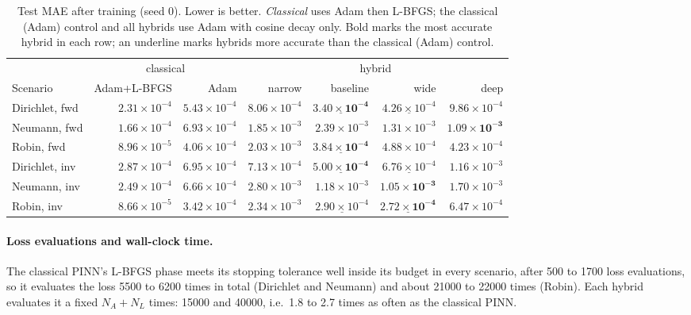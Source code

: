 \begin{table}[t]
\centering
\caption{Test MAE after training (seed 0). Lower is better. \emph{Classical} uses Adam then L-BFGS; the
classical (Adam) control and all hybrids use Adam with cosine decay only. Bold marks the most accurate hybrid in
each row; an underline marks hybrids more accurate than the classical (Adam) control.}
\label{tab:conv-mae}
\small
\setlength{\tabcolsep}{4pt}
\begin{tabular}{@{}lrrrrrr@{}}
\toprule
 & \multicolumn{2}{c}{classical} & \multicolumn{4}{c}{hybrid} \\
\cmidrule(lr){2-3}\cmidrule(l){4-7}
Scenario & Adam+L-BFGS & Adam & narrow & baseline & wide & deep \\
\midrule
Dirichlet, fwd & $2.31\times10^{-4}$ & $5.43\times10^{-4}$ & $8.06\times10^{-4}$ & $\underline{\mathbf{3.40\times10^{-4}}}$ & $\underline{4.26\times10^{-4}}$ & $9.86\times10^{-4}$ \\
Neumann, fwd   & $1.66\times10^{-4}$ & $6.93\times10^{-4}$ & $1.85\times10^{-3}$ & $2.39\times10^{-3}$ & $1.31\times10^{-3}$ & $\mathbf{1.09\times10^{-3}}$ \\
Robin, fwd     & $8.96\times10^{-5}$ & $4.06\times10^{-4}$ & $2.03\times10^{-3}$ & $\underline{\mathbf{3.84\times10^{-4}}}$ & $4.88\times10^{-4}$ & $4.23\times10^{-4}$ \\
Dirichlet, inv & $2.87\times10^{-4}$ & $6.95\times10^{-4}$ & $7.13\times10^{-4}$ & $\underline{\mathbf{5.00\times10^{-4}}}$ & $\underline{6.76\times10^{-4}}$ & $1.16\times10^{-3}$ \\
Neumann, inv   & $2.49\times10^{-4}$ & $6.66\times10^{-4}$ & $2.80\times10^{-3}$ & $1.18\times10^{-3}$ & $\mathbf{1.05\times10^{-3}}$ & $1.70\times10^{-3}$ \\
Robin, inv     & $8.66\times10^{-5}$ & $3.42\times10^{-4}$ & $2.34\times10^{-3}$ & $\underline{2.90\times10^{-4}}$ & $\underline{\mathbf{2.72\times10^{-4}}}$ & $6.47\times10^{-4}$ \\
\bottomrule
\end{tabular}
\end{table}

\paragraph{Loss evaluations and wall-clock time.}
The classical PINN's L-BFGS phase meets its stopping tolerance well inside its budget in every scenario, after
500 to 1700 loss evaluations, so it evaluates the loss 5500 to 6200 times in total (Dirichlet and Neumann)
and about 21000 to 22000 times (Robin). Each hybrid evaluates it a fixed $N_A+N_L$ times: 15000 and 40000,
i.e.\ 1.8 to 2.7 times as often as the classical PINN.

